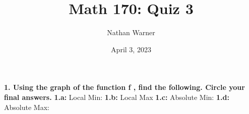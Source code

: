 \documentclass{report}
\title{\Huge{Math 170: Quiz 3}}
\author{\huge{Nathan Warner}}
\date{\huge{April 3, 2023}}
\begin{document}
    \maketitle
    \bigbreak \noindent 
    \begin{mdframed}
      \textbf{1. Using the graph of the function f , find the following. Circle your final answers.}
      \bigbreak \noindent 
      \hspace{\parindent} \textbf{1.a:} Local Min: 
      \bigbreak \noindent 
      \hspace{\parindent} \textbf{1.b:} Local Max 
      \bigbreak \noindent 
      \hspace{\parindent} \textbf{1.c:} Absolute Min: 
      \bigbreak \noindent 
      \hspace{\parindent} \textbf{1.d:} Absolute Max: 
    \end{mdframed}
\end{document}
